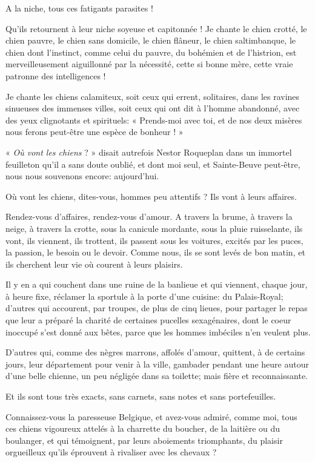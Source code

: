 A la niche, tous ces fatigants parasites !

Qu’ils retournent à leur niche soyeuse et capitonnée !
Je chante le chien crotté, le chien pauvre, le chien sans domicile, le
chien flâneur, le chien saltimbanque, le chien dont
l’instinct, comme celui du pauvre, du bohémien et de
l’histrion, est merveilleusement aiguillonné par la
nécessité, cette si bonne mère, cette vraie patronne des intelligences
!

Je chante les chiens calamiteux, soit ceux qui errent, solitaires, dans
les ravines sinueuses des immenses villes, soit ceux qui ont dit à
l’homme abandonné, avec des yeux clignotants et
spirituels: « Prends{}-moi avec toi, et de nos deux misères nous ferons
peut{}-être une espèce de bonheur ! »

« \textit{Où vont les chiens} ? » disait autrefois Nestor Roqueplan dans un
immortel feuilleton qu’il a sans doute oublié, et dont
moi seul, et Sainte{}-Beuve peut{}-être, nous nous souvenons encore:
aujourd’hui.

Où vont les chiens, dites{}-vous, hommes peu attentifs ? Ils vont à
leurs affaires.

Rendez{}-vous d’affaires, rendez{}-vous
d’amour. A travers la brume, à travers la neige, à
travers la crotte, sous la canicule mordante, sous la pluie
ruisselante, ils vont, ils viennent, ils trottent, ils passent sous les
voitures, excités par les puces, la passion, le besoin ou le devoir.
Comme nous, ils se sont levés de bon matin, et ils cherchent leur vie
où courent à leurs plaisirs.

Il y en a qui couchent dans une ruine de la banlieue et qui viennent,
chaque jour, à heure fixe, réclamer la sportule à la porte
d’une cuisine: du Palais{}-Royal;
d’autres qui accourent, par troupes, de plus de cinq
lieues, pour partager le repas que leur a préparé la charité de
certaines pucelles sexagénaires, dont le coeur inoccupé
s’est donné aux bêtes, parce que les hommes imbéciles
n’en veulent plus.

D’autres qui, comme des nègres marrons, affolés
d’amour, quittent, à de certains jours, leur
département pour venir à la ville, gambader pendant une heure autour
d’une belle chienne, un peu négligée dans sa toilette;
mais fière et reconnaissante.

Et ils sont tous très exacts, sans carnets, sans notes et sans
portefeuilles.

Connaissez{}-vous la paresseuse Belgique, et avez{}-vous admiré, comme
moi, tous ces chiens vigoureux attelés à la charrette du boucher, de la
laitière ou du boulanger, et qui témoignent, par leurs aboiements
triomphants, du plaisir orgueilleux qu’ils éprouvent à
rivaliser avec les chevaux ?


